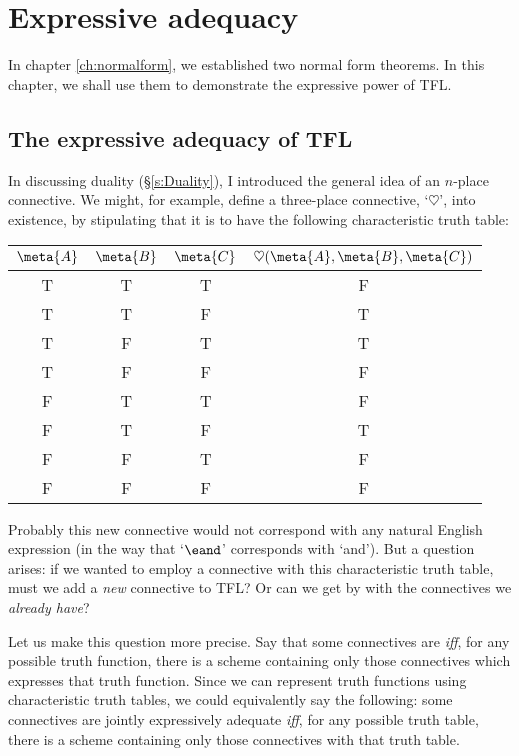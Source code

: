 \chapter{Expressive adequacy}\label{ch:expression}
In chapter \ref{ch:normalform}, we established two normal form theorems. In this chapter, we shall use them to demonstrate the expressive power of TFL.

\section{The expressive adequacy of TFL}
In discussing duality (\S\ref{s:Duality}), I introduced the general idea of an $n$-place connective. We might, for example, define a three-place connective, `$\heartsuit$', into existence, by stipulating that it is to have the following characteristic truth table:
\begin{center}
\begin{tabular}{c c c | c}
$\meta{A}$ & $\meta{B}$ & $\meta{C}$ & $\heartsuit(\meta{A},\meta{B},\meta{C})$\\
\hline
 T & T & T & F \\
 T & T & F & T \\
 T & F & T & T \\
 T & F & F & F \\
 F & T & T & F \\
 F & T & F & T \\
 F & F & T & F \\
 F & F & F & F
\end{tabular}
\end{center}
Probably this new connective would not correspond with any natural English expression (in the way that `$\eand$' corresponds with `and'). But a question arises: if we wanted to employ a connective with this characteristic truth table, must we add a \emph{new} connective to TFL? Or can we get by with the connectives we \emph{already have}?

Let us make this question more precise. Say that some connectives are  \emph{iff}, for any possible truth function, there is a scheme containing only those connectives which expresses that truth function. Since we can represent truth functions using characteristic truth tables, we could equivalently say the following: some connectives are jointly expressively adequate \emph{iff}, for any possible truth table, there is a scheme containing only those connectives with that truth table.

